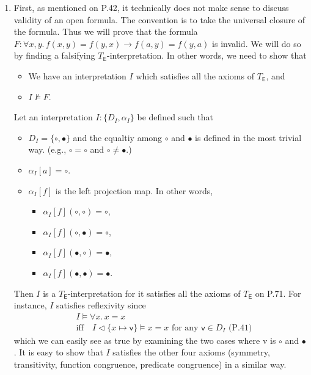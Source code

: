 \begin{exer}[3.1]
    $ $
    \begin{enumerate}[label=(\alph*)]
        \item
            First, as mentioned on P.42, it technically does not make sense to discuss validity of an open formula.
            The convention is to take the universal closure of the formula.
            Thus we will prove that the formula $F: \forall x, y.\, f(x, y) = f(y, x) \rightarrow f(a, y) = f(y, a)$ is invalid.
            We will do so by finding a falsifying $T_{\textsf{E}}$-interpretation.
            In other words, we need to show that
            \begin{itemize}
                \item
                    We have an interpretation $I$ which satisfies all the axioms of $T_{\textsf{E}}$, and
                \item
                    $I \not\models F$.
            \end{itemize}
            Let an interpretation $I: \{ D_I, \alpha_I \}$ be defined such that
            \begin{itemize}
                \item
                    $D_I = \{ \circ, \bullet \}$ and the equaltiy among $\circ$ and $\bullet$ is defined in the most trivial way.
                    (e.g., $\circ = \circ$ and $\circ \ne \bullet$.)
                \item
                    $\alpha_I[a] = \circ$.
                \item
                    $\alpha_I[f]$ is the left projection map.
                    In other words,
                    \begin{itemize}
                        \item
                            $\alpha_I[f](\circ, \circ) = \circ$,
                        \item
                            $\alpha_I[f](\circ, \bullet) = \circ$,
                        \item
                            $\alpha_I[f](\bullet, \circ) = \bullet$,
                        \item
                            $\alpha_I[f](\bullet, \bullet) = \bullet$.
                    \end{itemize}
            \end{itemize}
            Then $I$ is a $T_{\textsf{E}}$-interpretation for it satisfies all the axioms of $T_{\textsf{E}}$ on P.71.
            For instance, $I$ satisfies reflexivity since
            \begin{align*}
                &I \models \forall x.\, x = x \\
                &\text{iff}\quad I \vartriangleleft \{ x \mapsto \textsf{v} \} \models x = x \text{ for any $\textsf{v} \in D_I$ (P.41)}
            \end{align*}
            which we can easily see as \textsf{true} by examining the two cases where \textsf{v} is $\circ$ and $\bullet$.
            It is easy to show that $I$ satisfies the other four axioms (symmetry, transitivity, function congruence, predicate congruence) in a similar way.


\end{enumerate}
\end{exer}
